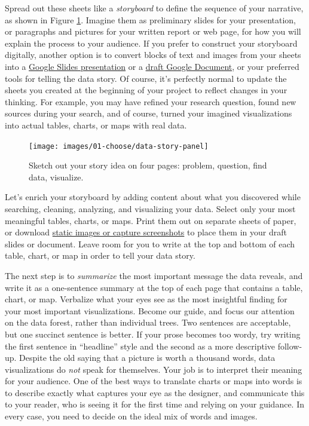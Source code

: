 \documentclass[
  english,
]{book}
\begin{document}
Spread out these sheets like a \emph{storyboard} to define the sequence of your narrative, as shown in Figure \ref{fig:data-story-panel2}. Imagine them as preliminary slides for your presentation, or paragraphs and pictures for your written report or web page, for how you will explain the process to your audience. If you prefer to construct your storyboard digitally, another option is to convert blocks of text and images from your sheets into a \href{https://www.google.com/slides/about/}{Google Slides presentation} or a \href{https://www.google.com/docs/about/}{draft Google Document}, or your preferred tools for telling the data story. Of course, it's perfectly normal to update the sheets you created at the beginning of your project to reflect changes in your thinking. For example, you may have refined your research question, found new sources during your search, and of course, turned your imagined visualizations into actual tables, charts, or maps with real data.



\begin{figure}
\texttt{[image: images/01-choose/data-story-panel]} \caption{Sketch out your story idea on four pages: problem, question, find data, visualize.}\label{fig:data-story-panel2}
\end{figure}

Let's enrich your storyboard by adding content about what you discovered while searching, cleaning, analyzing, and visualizing your data. Select only your most meaningful tables, charts, or maps. Print them out on separate sheets of paper, or download \href{static.html}{static images or capture screenshots} to place them in your draft slides or document. Leave room for you to write at the top and bottom of each table, chart, or map in order to tell your data story.

The next step is to \emph{summarize} the most important message the data reveals, and write it as a one-sentence summary at the top of each page that contains a table, chart, or map. Verbalize what your eyes see as the most insightful finding for your most important visualizations. Become our guide, and focus our attention on the data forest, rather than individual trees. Two sentences are acceptable, but one succinct sentence is better. If your prose becomes too wordy, try writing the first sentence in ``headline'' style and the second as a more descriptive follow-up. Despite the old saying that a picture is worth a thousand words, data visualizations do \emph{not} speak for themselves. Your job is to interpret their meaning for your audience. One of the best ways to translate charts or maps into words is to describe exactly what captures your eye as the designer, and communicate this to your reader, who is seeing it for the first time and relying on your guidance. In every case, you need to decide on the ideal mix of words and images.
\end{document}
